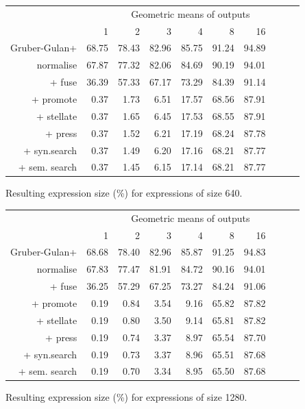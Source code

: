 \begin{figure}\begin{tabular}{rrrrrrrrrr}
 & \multicolumn{9}{c}{Geometric means of outputs} \\
 & 1 & 2 & 3 & 4 & 8 & 16 \\
Gruber-Gulan+ & 68.75 & 78.43 & 82.96 & 85.75 & 91.24 & 94.89 \\
normalise & 67.87 & 77.32 & 82.06 & 84.69 & 90.19 & 94.01 \\
+ fuse & 36.39 & 57.33 & 67.17 & 73.29 & 84.39 & 91.14 \\
+ promote & 0.37 & 1.73 & 6.51 & 17.57 & 68.56 & 87.91 \\
+ stellate & 0.37 & 1.65 & 6.45 & 17.53 & 68.55 & 87.91 \\
+ press & 0.37 & 1.52 & 6.21 & 17.19 & 68.24 & 87.78 \\
+ syn.search & 0.37 & 1.49 & 6.20 & 17.16 & 68.21 & 87.77 \\
+ sem. search & 0.37 & 1.45 & 6.15 & 17.14 & 68.21 & 87.77 \\
\end{tabular}\caption{Resulting expression size (\%) for expressions of size 640.}\end{figure}
\begin{figure}\begin{tabular}{rrrrrrrrrr}
 & \multicolumn{9}{c}{Geometric means of outputs} \\
 & 1 & 2 & 3 & 4 & 8 & 16 \\
Gruber-Gulan+ & 68.68 & 78.40 & 82.96 & 85.87 & 91.25 & 94.83 \\
normalise & 67.83 & 77.47 & 81.91 & 84.72 & 90.16 & 94.01 \\
+ fuse & 36.25 & 57.29 & 67.25 & 73.27 & 84.24 & 91.06 \\
+ promote & 0.19 & 0.84 & 3.54 & 9.16 & 65.82 & 87.82 \\
+ stellate & 0.19 & 0.80 & 3.50 & 9.14 & 65.81 & 87.82 \\
+ press & 0.19 & 0.74 & 3.37 & 8.97 & 65.54 & 87.70 \\
+ syn.search & 0.19 & 0.73 & 3.37 & 8.96 & 65.51 & 87.68 \\
+ sem. search & 0.19 & 0.70 & 3.34 & 8.95 & 65.50 & 87.68 \\
\end{tabular}\caption{Resulting expression size (\%) for expressions of size 1280.}\end{figure}
